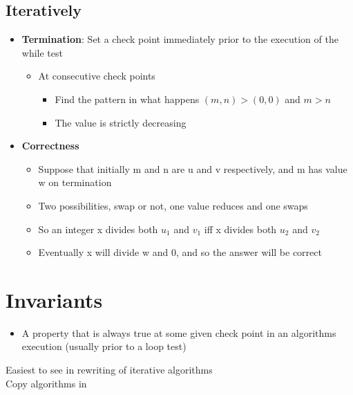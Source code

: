 \documentclass{article}[18pt]
\begin{document}
\subsection{Iteratively}
\begin{itemize}
	\item \textbf{Termination}: Set a check point immediately prior to the execution of the while test
	\begin{itemize}
		\item At consecutive check points
		\begin{itemize}
			\item Find the pattern in what happens $(m,n)>(0,0)$ and $m>n$
			\item The value is strictly decreasing
		\end{itemize}
	\end{itemize}
	\item \textbf{Correctness}
	\begin{itemize}
		\item Suppose that initially m and n are u and v respectively, and m has value w on termination
		\item Two possibilities, swap or not, one value reduces and one swaps
		\item So an integer x divides both $u_1$ and $v_1$ iff x divides both $u_2$ and $v_2$
		\item Eventually x will divide w and 0, and so the answer will be correct
	\end{itemize}
\end{itemize}
\section{Invariants}
\begin{itemize}
	\item A property that is always true at some given check point in an algorithms execution (usually prior to a loop test)
\end{itemize}
Easiest to see in rewriting of iterative algorithms\\
Copy algorithms in
\end{document}
